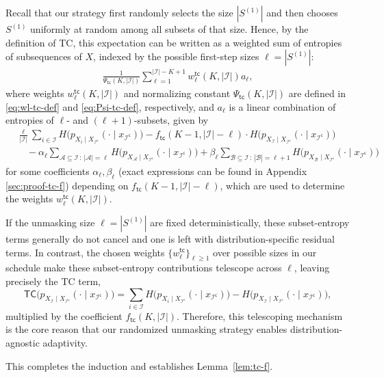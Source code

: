 \documentclass[english]{article}
\newcommand{\cA}{\mathcal{A}}
\newcommand{\cB}{\mathcal{B}}
\newcommand{\cI}{\mathcal{I}}
\newcommand{\TC}{\mathsf{TC}}
\newcommand{\tc}{\mathsf{tc}}
\begin{document}
Recall that our strategy first randomly selects the size $|S^{(1)}|$ and then chooses $S^{(1)}$ uniformly at random among all subsets of that size.
Hence, by the definition of TC, this expectation can be written as a weighted sum of entropies of subsequences of $X$, indexed by the possible first-step sizes $\ell=|S^{(1)}|$:
\begin{align}\label{eq:weighted-sum-TC}
\frac{1}{\Psi_{\tc}(K, |\cI|)}\sum_{\ell = 1}^{|\cI| - K + 1} w_\ell^\tc(K,|\cI|) a_\ell ,
\end{align}
where weights $w_\ell^\tc(K,|\cI|)$ and normalizing constant $\Psi_{\tc}(K,|\cI|)$ are defined in \eqref{eq:wl-tc-def} and \eqref{eq:Psi-tc-def}, respectively, and $a_\ell$ is a linear combination of entropies of $\ell$- and $(\ell+1)$-subsets, given by 
\begin{align*}
& \frac{\ell}{|\cI|} \sum_{i \in \cI} H \big(p_{X_i \mid X_{\cI^\mathsf{c}}}(\cdot \mid x_{\cI^\mathsf{c}}) \big) - f_\tc(K-1, |\cI|-\ell) \cdot H \big(p_{X_{\cI} \mid X_{\cI^\mathsf{c}}}(\cdot \mid x_{\cI^\mathsf{c}}) \big) \\
&\quad  - \alpha_\ell\sum_{\cA\subseteq \cI \,:\,|\cA|=\ell} H \big(p_{X_\cA \mid X_{\cI^\mathsf{c}}}(\cdot \mid x_{\cI^\mathsf{c}}) \big) + \beta_\ell \sum_{\cB\subseteq \cI \,:\,|\cB|=\ell+1} H \big(p_{X_\cB \mid X_{\cI^\mathsf{c}}}(\cdot \mid x_{\cI^\mathsf{c}}) \big)
\end{align*}
for some coefficients $ \alpha_\ell, \beta_\ell$ (exact expressions can be found in Appendix \ref{sec:proof-tc-f}) depending on $f_\tc(K-1, |\cI|-\ell)$, which are used to determine the weights $w_\ell^\tc(K,|\cI|)$.

If the unmasking size $\ell = |S^{(1)}|$ are fixed deterministically, these subset-entropy terms generally do not cancel and one is left with distribution-specific residual terms. In contrast, the chosen weights $\{w^\tc_\ell\}_{\ell \geq 1}$ over possible sizes in our schedule make these subset-entropy contributions telescope across $\ell$, leaving precisely the TC term, 
$$\TC\big(p_{X_{\cI} \mid X_{\cI^\mathsf{c}}}(\cdot \mid x_{\cI^\mathsf{c}})\big) = \sum_{i\in\cI} H\big(p_{X_i \mid X_{\cI^\mathsf{c}}}(\cdot \mid x_{\cI^\mathsf{c}})\big) - H\big(p_{X_{\cI} \mid X_{\cI^\mathsf{c}}}(\cdot \mid x_{\cI^\mathsf{c}})\big),$$
multiplied by the coefficient $f_\tc(K, |\cI|)$. 
Therefore, this telescoping mechanism is the core reason that our randomized unmasking strategy enables distribution-agnostic adaptivity.

This completes the induction and establishes Lemma~\ref{lem:tc-f}.
\end{document}

